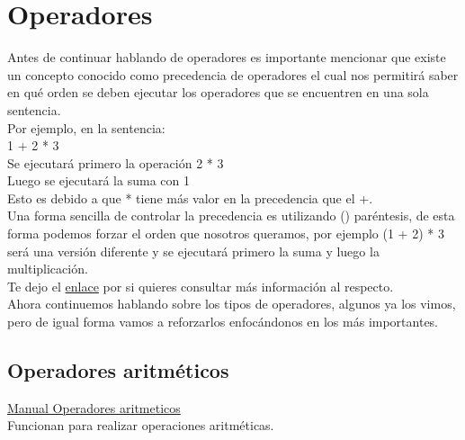 \documentclass{article}
\begin{document}
\section{Operadores}%
Antes de continuar hablando de operadores es importante mencionar que existe un
concepto conocido como precedencia de operadores el cual nos permitirá saber en
qué orden se deben ejecutar los operadores que se encuentren en una sola
sentencia.\\

Por ejemplo, en la sentencia:\\

1 + 2 * 3\\

Se ejecutará primero la operación 2 * 3\\
Luego se ejecutará la suma con 1\\

Esto es debido a que * tiene más valor en la precedencia que el +.\\

Una forma sencilla de controlar la precedencia es utilizando () paréntesis, de
esta forma podemos forzar el orden que nosotros queramos, por ejemplo (1 + 2) *
3 será una versión diferente y se ejecutará primero la suma y luego la
multiplicación.\\

Te dejo el
\href{http://php.net/manual/es/language.operators.precedence.php}{enlace} por
si quieres consultar más información al respecto.\\

Ahora continuemos hablando sobre los tipos de operadores, algunos ya los vimos,
pero de igual forma vamos a reforzarlos enfocándonos en los más importantes.\\

\subsection*{Operadores aritméticos}%
\href{http://php.net/manual/es/language.operators.arithmetic.php}{Manual Operadores aritmeticos}\\
Funcionan para realizar operaciones aritméticas.\\

\newpage
\end{document}
